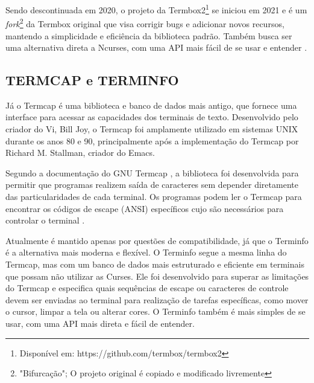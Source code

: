 \vspace{0.4cm}

\vspace{0.4cm}

Sendo descontinuada em 2020, o projeto da Termbox2\footnote{Disponível em: https://github.com/termbox/termbox2}
se iniciou em 2021 e é um \textit{fork}\footnote{"Bifurcação"; O projeto original
é copiado e modificado livremente} da Termbox original que visa corrigir bugs e
adicionar novos recursos, mantendo a simplicidade e eficiência da biblioteca padrão.
Também busca ser uma alternativa direta a Ncurses, com uma API mais fácil de se usar
e entender \cite{termbox2_github}.

\vspace{0.4cm}

\vspace{0.4cm}

\subsection{TERMCAP e TERMINFO}

Já o Termcap é uma biblioteca e banco de dados mais antigo, que fornece uma
interface para acessar as capacidades dos terminais de texto. Desenvolvido pelo criador
do Vi, Bill Joy, o Termcap foi amplamente utilizado em sistemas UNIX durante os anos
80 e 90, principalmente após a implementação do Termcap por Richard M. Stallman,
criador do Emacs.

Segundo a documentação do GNU Termcap \cite{stallman_termcap}, a biblioteca foi desenvolvida
para permitir que programas realizem saída de caracteres sem depender diretamente
das particularidades de cada terminal. Os programas podem ler o Termcap para
encontrar os códigos de escape (ANSI) específicos cujo são necessários para
controlar o terminal \cite{kerrisk_termcap_man7}.

\vspace{0.4cm}

\vspace{0.4cm}

Atualmente é mantido apenas por questões de compatibilidade, já que o Terminfo é
a alternativa mais moderna e flexível. O Terminfo segue a mesma linha do Termcap,
mas com um banco de dados mais estruturado e eficiente em terminais que possam
não utilizar as Curses. Ele foi desenvolvido para superar as limitações do Termcap
e especifica quais sequências de escape ou caracteres de controle devem ser enviadas
ao terminal para realização de tarefas específicas, como mover o cursor, limpar a
tela ou alterar cores. O Terminfo também é mais simples de se usar, com uma API mais
direta e fácil de entender. \cite{man7_terminfo, tldp_text_terminal_howto}

